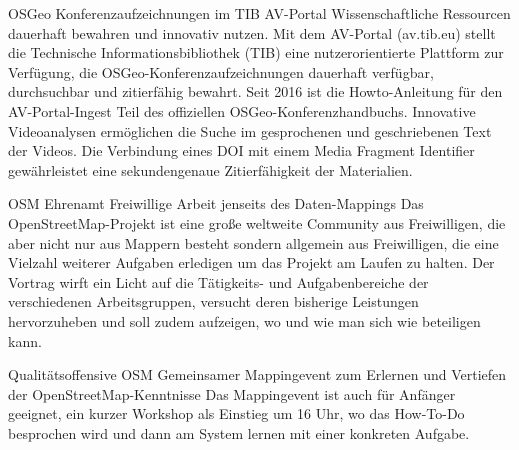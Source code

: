 %
{OSGeo Konferenzaufzeichnungen im TIB AV-Portal}%
{Wissenschaftliche Ressourcen dauerhaft bewahren und innovativ nutzen.}%
{Mit dem AV-Portal (av.tib.eu) stellt die Technische Informationsbibliothek (TIB) eine
nutzerorientierte Plattform zur Verfügung, die OSGeo-Konferenzaufzeichnungen dauerhaft verfügbar,
durchsuchbar und zitierfähig bewahrt. Seit 2016 ist die Howto-Anleitung für den AV-Portal-Ingest
Teil des offiziellen OSGeo-Konferenzhandbuchs. Innovative  Videoanalysen ermöglichen die Suche im
gesprochenen und geschriebenen Text der Videos. Die Verbindung eines DOI mit einem Media Fragment
Identifier gewährleistet eine sekundengenaue Zitierfähigkeit der Materialien. }

%
{OSM Ehrenamt}%
{Freiwillige Arbeit jenseits des Daten-Mappings}%
{Das OpenStreetMap-Projekt ist eine große weltweite Community aus
Freiwilligen, die aber nicht nur aus Mappern besteht sondern allgemein
aus Freiwilligen, die eine Vielzahl weiterer Aufgaben erledigen um das
Projekt am Laufen zu halten. Der Vortrag wirft ein Licht auf die
Tätigkeits- und Aufgabenbereiche der verschiedenen Arbeitsgruppen,
versucht deren bisherige Leistungen hervorzuheben und soll zudem
aufzeigen, wo und wie man sich wie beteiligen kann.}

%
{Qualitätsoffensive OSM}%
{Gemeinsamer Mappingevent zum Erlernen und Vertiefen der OpenStreetMap-Kenntnisse}%
{Das Mappingevent ist auch für Anfänger geeignet, ein kurzer Workshop als Einstieg um 16 Uhr, wo das How-To-Do besprochen wird und dann am System lernen mit einer konkreten Aufgabe.}
